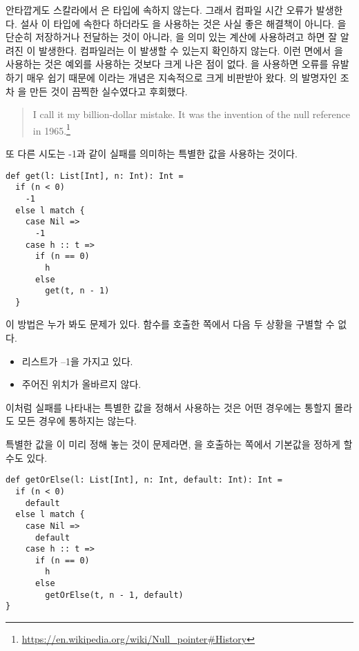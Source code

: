안타깝게도 스칼라에서 은  타입에 속하지 않는다. 그래서
컴파일 시간 오류가 발생한다. 설사 이  타입에 속한다
하더라도 을 사용하는 것은 사실 좋은 해결책이 아니다. 을
단순히 저장하거나 전달하는 것이 아니라, 을 의미 있는 계산에
사용하려고 하면 잘 알려진 이 발생한다. 컴파일러는
이 발생할 수 있는지 확인하지 않는다. 이런 면에서
을 사용하는 것은 예외를 사용하는 것보다 크게 나은 점이 없다.
을 사용하면 오류를 유발하기 매우 쉽기 때문에 이라는 개념은
지속적으로 크게 비판받아 왔다. 의 발명자인 조차 을 만든 것이 끔찍한 실수였다고 후회했다.

\begin{quote}
I call it my billion-dollar mistake. It was the invention of the null reference
in 1965.\footnote{\url{https://en.wikipedia.org/wiki/Null\_pointer\#History}}
\end{quote}

또 다른 시도는 -1과 같이 실패를 의미하는 특별한 값을 사용하는 것이다.

\begin{verbatim}
def get(l: List[Int], n: Int): Int =
  if (n < 0)
    -1
  else l match {
    case Nil =>
      -1
    case h :: t =>
      if (n == 0)
        h
      else
        get(t, n - 1)
  }
\end{verbatim}

이 방법은 누가 봐도 문제가 있다. 함수를 호출한 쪽에서 다음 두 상황을 구별할 수 없다.

\begin{itemize}
\item 리스트가 –1을 가지고 있다.
\item 주어진 위치가 올바르지 않다.
\end{itemize}

이처럼 실패를 나타내는 특별한 값을 정해서 사용하는 것은 어떤 경우에는 통할지 몰라도 모든 경우에 통하지는 않는다.

특별한 값을 이 미리 정해 놓는 것이 문제라면, 을 호출하는 쪽에서 기본값을 정하게 할 수도 있다.

\begin{verbatim}
def getOrElse(l: List[Int], n: Int, default: Int): Int =
  if (n < 0)
    default
  else l match {
    case Nil =>
      default
    case h :: t =>
      if (n == 0)
        h
      else
        getOrElse(t, n - 1, default)
}
\end{verbatim}

